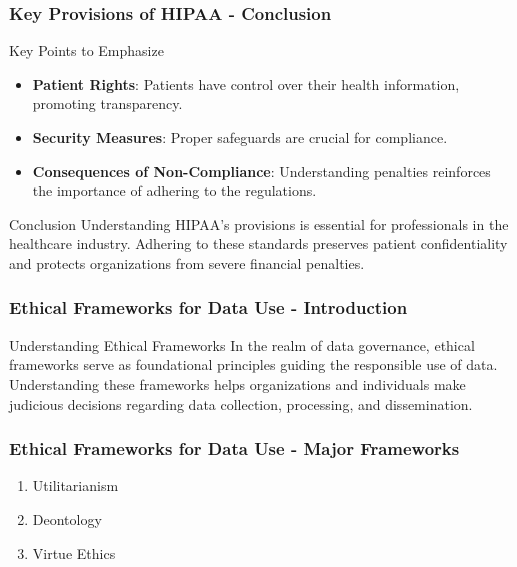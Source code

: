 \documentclass[aspectratio=169]{beamer}
\begin{document}
\begin{frame}[fragile]
    \frametitle{Key Provisions of HIPAA - Conclusion}
    \begin{block}{Key Points to Emphasize}
        \begin{itemize}
            \item \textbf{Patient Rights}: Patients have control over their health information, promoting transparency.
            \item \textbf{Security Measures}: Proper safeguards are crucial for compliance.
            \item \textbf{Consequences of Non-Compliance}: Understanding penalties reinforces the importance of adhering to the regulations.
        \end{itemize}
    \end{block}
    \begin{block}{Conclusion}
        Understanding HIPAA's provisions is essential for professionals in the healthcare industry. Adhering to these standards preserves patient confidentiality and protects organizations from severe financial penalties.
    \end{block}
\end{frame}

\begin{frame}[fragile]
    \frametitle{Ethical Frameworks for Data Use - Introduction}
    \begin{block}{Understanding Ethical Frameworks}
        In the realm of data governance, ethical frameworks serve as foundational principles guiding the responsible use of data. 
        Understanding these frameworks helps organizations and individuals make judicious decisions regarding data collection, processing, and dissemination.
    \end{block}
\end{frame}

\begin{frame}[fragile]
    \frametitle{Ethical Frameworks for Data Use - Major Frameworks}
    \begin{enumerate}
        \item Utilitarianism
        \item Deontology
        \item Virtue Ethics
    \end{enumerate}
\end{frame}
\end{document}
